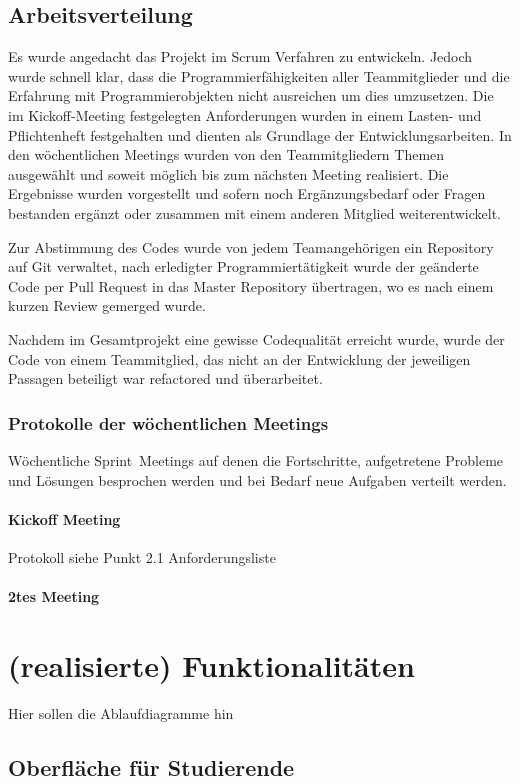\documentclass[12pt,a4paper,parskip]{scrreprt}
\begin{document}
\section{Arbeitsverteilung}
Es wurde angedacht das Projekt im Scrum Verfahren zu entwickeln. Jedoch wurde schnell klar, dass die Programmierfähigkeiten aller Teammitglieder und die Erfahrung mit Programmierobjekten nicht ausreichen um dies umzusetzen.
Die im Kickoff-Meeting festgelegten Anforderungen wurden in einem Lasten- und Pflichtenheft festgehalten und dienten als Grundlage der Entwicklungsarbeiten. In den wöchentlichen Meetings wurden von den Teammitgliedern Themen ausgewählt und soweit möglich bis zum nächsten Meeting realisiert. Die Ergebnisse wurden vorgestellt und sofern noch Ergänzungsbedarf oder Fragen bestanden ergänzt oder zusammen mit einem anderen Mitglied weiterentwickelt.

Zur Abstimmung des Codes wurde von jedem Teamangehörigen ein Repository auf Git verwaltet, nach erledigter Programmiertätigkeit wurde der geänderte Code per Pull Request in das Master Repository übertragen, wo es nach einem kurzen Review gemerged wurde.

Nachdem im Gesamtprojekt eine gewisse Codequalität erreicht wurde, wurde der Code von einem Teammitglied, das nicht an der Entwicklung der jeweiligen Passagen beteiligt war refactored und überarbeitet.
\subsection{Protokolle der wöchentlichen Meetings}
Wöchentliche \glqq Sprint\grqq\ Meetings auf denen die Fortschritte, aufgetretene Probleme und Lösungen besprochen werden und bei Bedarf neue Aufgaben verteilt werden.
\subsubsection{Kickoff Meeting}
Protokoll siehe Punkt 2.1 Anforderungsliste
\subsubsection{2tes Meeting}

\chapter{(realisierte) Funktionalitäten}
Hier sollen die Ablaufdiagramme hin
\section{Oberfläche für Studierende}
\end{document}
